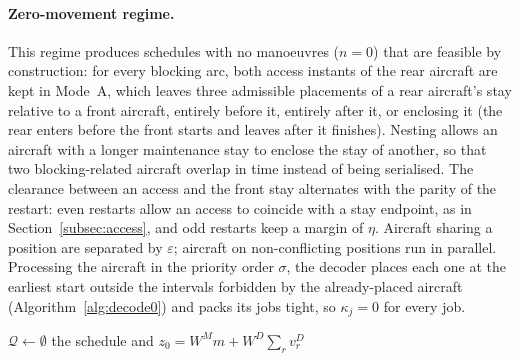 \paragraph{Zero-movement regime.}
This regime produces schedules with no manoeuvres ($n = 0$) that are
feasible by construction: for every blocking arc, both access instants
of the rear aircraft are kept in Mode~A, which leaves three admissible
placements of a rear aircraft's stay relative to a front aircraft,
entirely before it, entirely after it, or enclosing it (the rear enters
before the front starts and leaves after it finishes).  Nesting allows
an aircraft with a longer maintenance stay to enclose the stay of
another, so that two blocking-related aircraft overlap in time instead
of being serialised.  The clearance between an access and the front stay
alternates with the parity of the restart: even restarts allow an access
to coincide with a stay endpoint, as in Section~\ref{subsec:access}, and odd
restarts keep a margin of $\eta$.  Aircraft sharing a position are
separated by $\varepsilon$; aircraft on non-conflicting positions run in
parallel.  Processing the aircraft in the priority order $\sigma$, the
decoder places each one at the earliest start outside the intervals
forbidden by the already-placed aircraft (Algorithm~\ref{alg:decode0})
and packs its jobs tight, so $\kappa_j = 0$ for every job.

\begin{algorithm}[htbp]
\DontPrintSemicolon
{}
$\mathcal{Q} \leftarrow \emptyset$ 
\Return the schedule and $z_0 = W^M m + W^D \sum_r v^D_r$ 
\caption{$\textsc{Decode}_0$ --- zero-movement decoder.}
\label{alg:decode0}
\end{algorithm}

